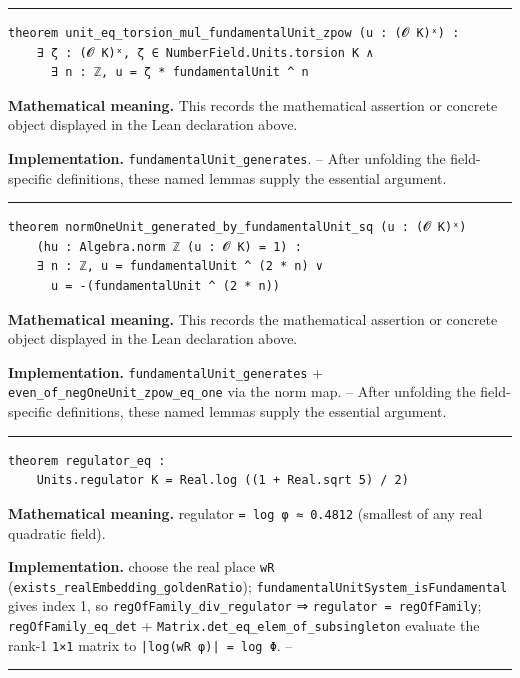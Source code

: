 \documentclass[UTF8,a4paper,11pt,fontset=fandol]{ctexart}
\theoremstyle{definition}
\newcommand{\statementsep}{\par\medskip\hrule\medskip}
\begin{document}
\statementsep
\begin{verbatim}
theorem unit_eq_torsion_mul_fundamentalUnit_zpow (u : (𝓞 K)ˣ) :
    ∃ ζ : (𝓞 K)ˣ, ζ ∈ NumberField.Units.torsion K ∧
      ∃ n : ℤ, u = ζ * fundamentalUnit ^ n
\end{verbatim}
\noindent\textbf{Mathematical meaning.} This records the mathematical assertion or concrete object displayed in the Lean declaration above.\par
\noindent\textbf{Implementation.} \texttt{fundamentalUnit\_\allowbreak{}generates}. -- After unfolding the field-specific definitions, these named lemmas supply the essential argument.\par
\statementsep
\begin{verbatim}
theorem normOneUnit_generated_by_fundamentalUnit_sq (u : (𝓞 K)ˣ)
    (hu : Algebra.norm ℤ (u : 𝓞 K) = 1) :
    ∃ n : ℤ, u = fundamentalUnit ^ (2 * n) ∨
      u = -(fundamentalUnit ^ (2 * n))
\end{verbatim}
\noindent\textbf{Mathematical meaning.} This records the mathematical assertion or concrete object displayed in the Lean declaration above.\par
\noindent\textbf{Implementation.} \texttt{fundamentalUnit\_\allowbreak{}generates} + \texttt{even\_\allowbreak{}of\_\allowbreak{}negOneUnit\_\allowbreak{}zpow\_\allowbreak{}eq\_\allowbreak{}one} via the norm map. -- After unfolding the field-specific definitions, these named lemmas supply the essential argument.\par
\statementsep
\begin{verbatim}
theorem regulator_eq :
    Units.regulator K = Real.log ((1 + Real.sqrt 5) / 2)
\end{verbatim}
\noindent\textbf{Mathematical meaning.} regulator \texttt{= log φ ≈ 0.\allowbreak{}4812} (smallest of any real quadratic field).\par
\noindent\textbf{Implementation.} choose the real place \texttt{wR} (\texttt{exists\_\allowbreak{}realEmbedding\_\allowbreak{}goldenRatio}); \texttt{fundamentalUnitSystem\_\allowbreak{}isFundamental} gives index 1, so \texttt{regOfFamily\_\allowbreak{}div\_\allowbreak{}regulator} ⇒ \texttt{regulator = regOfFamily}; \texttt{regOfFamily\_\allowbreak{}eq\_\allowbreak{}det} + \texttt{Matrix.\allowbreak{}det\_\allowbreak{}eq\_\allowbreak{}elem\_\allowbreak{}of\_\allowbreak{}subsingleton} evaluate the rank-1 \texttt{1×1} matrix to \texttt{|log(wR φ)| = log Φ}. --\par
\statementsep
\end{document}
